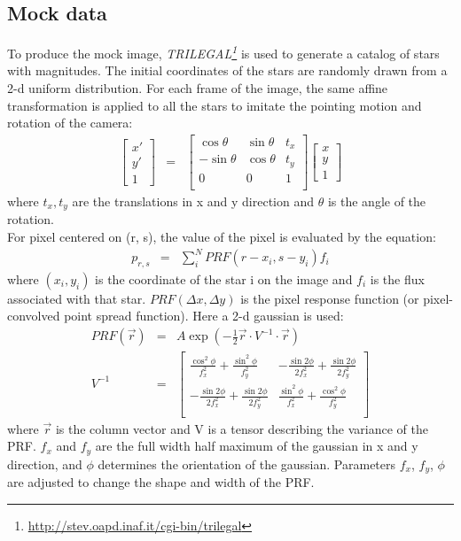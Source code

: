 \documentclass[12pt, preprint]{aastex}
\newcommand{\project}[1]{\textsl{#1}}
\begin{document}
\subsection{Mock data}
To produce the mock image, \project{TRILEGAL\footnote{\url{http://stev.oapd.inaf.it/cgi-bin/trilegal}}} \citep{TRILEGAL}  is used to generate a catalog of stars with magnitudes. 
The initial coordinates of the stars are randomly drawn from a 2-d uniform distribution. 
For each frame of the image, the same affine transformation is applied  to all the stars to imitate the pointing motion and rotation of the camera:
\begin{eqnarray}\label{transformation}
\begin{bmatrix}
    x' \\
    y' \\
    1
\end{bmatrix}
&=&
\begin{bmatrix}
    \cos \theta & \sin \theta & t_x \\
    -\sin \theta & \cos \theta & t_y \\
    0 & 0 & 1 \\
\end{bmatrix}
\begin{bmatrix}
    x \\
    y \\
    1
\end{bmatrix}
\end{eqnarray}
where $t_x, t_y$ are the translations in x and y direction and $\theta$ is the angle of the rotation.\\
For pixel centered on (r, s), the value of the pixel is evaluated by the equation:
\begin{eqnarray}
p_{r,s} &=& \sum_{i}^{N} PRF(r-x_i, s-y_i) f_i
\end{eqnarray}
where $(x_i,y_i)$ is the coordinate of the star i on the image and $f_i$ is the flux associated with that star. 
$PRF(\Delta x, \Delta y)$ is the pixel response function (or pixel-convolved point spread function). 
Here a 2-d gaussian is used:
\begin{eqnarray} \label{prf}
PRF(\vec{r}) &=& A \exp(-\frac{1}{2} \vec{r}\cdot V^{-1}\cdot \vec{r}) \\
V^{-1} &=& 
\begin{bmatrix}
    \frac {\cos ^{2}\phi }{f_{x}^{2}}+\frac {\sin ^{2}\phi }{f_{y}^{2}} & -\frac {\sin 2\phi }{2f_{x}^{2}}+\frac {\sin 2\phi }{2f_{y}^{2}}  \\
    -\frac {\sin 2\phi }{2f_{x}^{2}}+\frac {\sin 2\phi }{2f_{y}^{2}} & \frac {\sin ^{2}\phi }{f_{x}^{2}}+\frac {\cos ^{2}\phi }{f_{y}^{2}} \\
\end{bmatrix}
\end{eqnarray}
where $\vec{r}$ is the column vector and V is a tensor describing the variance of the PRF.
$f_x$ and $f_y$ are the full width half maximum of the gaussian in x and y direction, and $\phi$ determines the orientation of the gaussian.
Parameters $f_x$, $f_y$, $\phi$ are adjusted to change the shape and width of the PRF.
\end{document}
